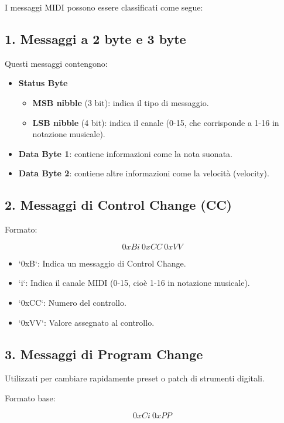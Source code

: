I messaggi MIDI possono essere classificati come segue:

\subsection*{1. Messaggi a 2 byte e 3 byte}

Questi messaggi contengono:

\begin{itemize}
    \item \textbf{Status Byte}
        \begin{itemize}
            \item \textbf{MSB nibble} (3 bit): indica il tipo di messaggio.
            \item \textbf{LSB nibble} (4 bit): indica il canale (0-15, che corrisponde a 1-16 in notazione musicale).
        \end{itemize}
    \item \textbf{Data Byte 1}: contiene informazioni come la nota suonata.
    \item \textbf{Data Byte 2}: contiene altre informazioni come la velocità (velocity).
\end{itemize}

\subsection*{2. Messaggi di Control Change (CC)}

Formato:

\[
0xBi \ 0xCC \ 0xVV
\]

\begin{itemize}
    \item `0xB`: Indica un messaggio di Control Change.
    \item `i`: Indica il canale MIDI (0-15, cioè 1-16 in notazione musicale).
    \item `0xCC`: Numero del controllo.
    \item `0xVV`: Valore assegnato al controllo.
\end{itemize}

\subsection*{3. Messaggi di Program Change}

Utilizzati per cambiare rapidamente preset o patch di strumenti digitali.

Formato base:

\[
0xCi \ 0xPP
\]

